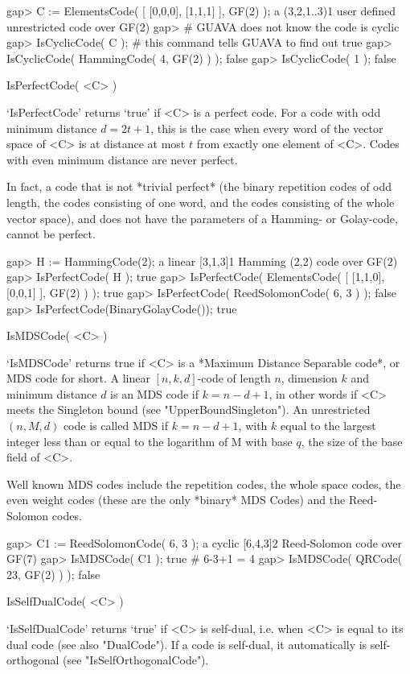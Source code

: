 \beginexample
gap> C := ElementsCode( [ [0,0,0], [1,1,1] ], GF(2) );
a (3,2,1..3)1 user defined unrestricted code over GF(2)
gap> # GUAVA does not know the code is cyclic
gap> IsCyclicCode( C );      # this command tells GUAVA to find out
true
gap> IsCyclicCode( HammingCode( 4, GF(2) ) );
false
gap> IsCyclicCode( 1 );
false 
\endexample

\>IsPerfectCode( <C> )

`IsPerfectCode' returns `true' if <C> is a perfect  code. For a code with
odd minimum distance $d = 2t+1$, this is the case  when every word of the
vector space of  <C> is at distance at  most $t$ from exactly one element
of <C>. Codes with even minimum distance are never perfect.

In  fact, a code  that is  not  *trivial perfect* (the binary  repetition
codes  of odd length, the  codes  consisting of  one  word, and the codes
consisting of the  whole vector space), and  does not have the parameters
of a Hamming- or Golay-code, cannot be perfect.

\beginexample
gap> H := HammingCode(2);
a linear [3,1,3]1 Hamming (2,2) code over GF(2)
gap> IsPerfectCode( H );
true
gap> IsPerfectCode( ElementsCode( [ [1,1,0], [0,0,1] ], GF(2) ) );
true
gap> IsPerfectCode( ReedSolomonCode( 6, 3 ) );
false
gap> IsPerfectCode(BinaryGolayCode());
true 
\endexample

\>IsMDSCode( <C> )

`IsMDSCode' returns  true if <C>  is a *Maximum Distance Separable code*,
or MDS code for short. A linear $[n, k, d]$-code of length $n$, dimension
$k$ and minimum distance $d$ is an MDS code  if $k=n-d+1$, in other words
if <C> meets  the   Singleton  bound (see  "UpperBoundSingleton").     An
unrestricted $(n, M, d)$ code is called MDS if  $k=n-d+1$, with $k$ equal
to the largest integer less than or equal to the logarithm of M with base
$q$, the size of the base field of <C>.

Well known MDS codes include the repetition codes, the whole space codes,
the even weight codes (these are the only *binary* MDS Codes) and the
Reed-Solomon codes.

\beginexample
gap> C1 := ReedSolomonCode( 6, 3 );
a cyclic [6,4,3]2 Reed-Solomon code over GF(7)
gap> IsMDSCode( C1 );
true    # 6-3+1 = 4
gap> IsMDSCode( QRCode( 23, GF(2) ) );
false 
\endexample

\>IsSelfDualCode( <C> )

`IsSelfDualCode'  returns `true' if <C>  is  self-dual, i.e.  when <C> is
equal to its dual code (see also "DualCode"). If  a code is self-dual, it
automatically is self-orthogonal (see "IsSelfOrthogonalCode").

